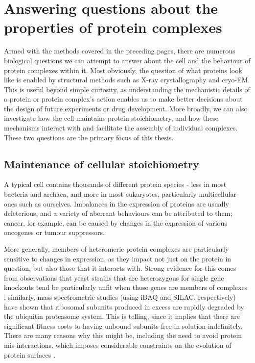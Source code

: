 \documentclass[a4paper,11pt,twoside,openright]{scrbook}
\begin{document}
\section{Answering questions about the properties of protein complexes}
Armed with the methods covered in the preceding pages, there are numerous
biological questions we can attempt to answer about the cell and the behaviour
of protein complexes within it. Most obviously, the question of what proteins
look like is enabled by structural methods such as X-ray crystallography and
cryo-EM. This is useful beyond simple curiosity, as understanding the
mechanistic details of a protein or protein complex's action enables us to make
better decisions about the design of future experiments or drug development.
More broadly, we can also investigate how the cell maintains protein
stoichiometry, and how these mechanisms interact with and facilitate the
assembly of individual complexes. These two questions are the primary focus of
this thesis.

\subsection{Maintenance of cellular stoichiometry}
A typical cell contains thousands of different protein species - less in most
bacteria and archaea, and more in most eukaryotes, particularly multicellular
ones such as ourselves. Imbalances in the expression of proteins are usually
deleterious, and a variety of aberrant behaviours can be attributed to them;
cancer, for example, can be caused by changes in the expression of various
oncogenes or tumour suppressors.

More generally, members of heteromeric protein complexes are particularly
sensitive to changes in expression, as they impact not just on the protein in
question, but also those that it interacts with. Strong evidence for this comes
from observations that yeast strains that are heterozygous for single gene
knockouts tend be particularly unfit when those genes are members of complexes
\cite{Papp2003}; similarly, mass spectrometric studies \cite{Lam2007,Sung2016}
(using iBAQ and SILAC, respectively) have shown that ribosomal subunits produced
in excess are rapidly degraded by the ubiquitin proteasome system. This is
telling, since it implies that there are significant fitness costs to having
unbound subunits free in solution indefinitely. There are many reasons why this
might be, including the need to avoid protein mis-interactions, which imposes
considerable constraints on the evolution of protein surfaces \cite{Yang2012}.
\end{document}
